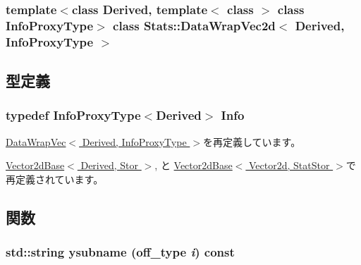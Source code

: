 \subsubsection*{template$<$class Derived, template$<$ class $>$ class InfoProxyType$>$ class Stats::DataWrapVec2d$<$ Derived, InfoProxyType $>$}



\subsection{型定義}
\hypertarget{classStats_1_1DataWrapVec2d_a76d2c248839f34168d2a3760bc1fbdb9}{
\subsubsection[{Info}]{\setlength{\rightskip}{0pt plus 5cm}typedef InfoProxyType$<$Derived$>$ {\bf Info}}}
\label{classStats_1_1DataWrapVec2d_a76d2c248839f34168d2a3760bc1fbdb9}


\hyperlink{classStats_1_1DataWrapVec_a76d2c248839f34168d2a3760bc1fbdb9}{DataWrapVec$<$ Derived, InfoProxyType $>$}を再定義しています。

\hyperlink{classStats_1_1Vector2dBase_a54a1e5a7adf65227680acc9effe631ac}{Vector2dBase$<$ Derived, Stor $>$}, と \hyperlink{classStats_1_1Vector2dBase_a54a1e5a7adf65227680acc9effe631ac}{Vector2dBase$<$ Vector2d, StatStor $>$}で再定義されています。

\subsection{関数}
\hypertarget{classStats_1_1DataWrapVec2d_a24e4f0faf052ff85a565d2b1e443a494}{
\subsubsection[{ysubname}]{\setlength{\rightskip}{0pt plus 5cm}std::string ysubname ({\bf off\_\-type} {\em i}) const}}
\label{classStats_1_1DataWrapVec2d_a24e4f0faf052ff85a565d2b1e443a494}



